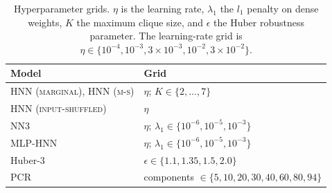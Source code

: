 \documentclass[sigconf,nonacm]{acmart}
\newcommand{\HNNMarg}{\textsc{HNN (marginal)}}
\newcommand{\HNNMS}{\textsc{HNN (m-s)}}
\newcommand{\HNNShuffle}{\textsc{HNN (input-shuffled)}}
\newcommand{\MLPHNN}{\textsc{MLP-HNN}}
\newcommand{\NNThree}{\textsc{NN3}}
\begin{document}
\begin{table}[h]
\centering
\caption{Hyperparameter grids. \(\eta\) is the learning rate,
\(\lambda_1\) the \(l_1\) penalty on dense weights, \(K\) the maximum clique
size, and \(\epsilon\) the Huber robustness parameter. The learning-rate grid is
\(\eta\in\{10^{-4},10^{-3},3\times10^{-3},10^{-2},3\times10^{-2}\}\).}
\label{tab:grids}
\small
\begin{tabular}{ll}
\toprule
Model & Grid\\
\midrule
\HNNMarg{}, \HNNMS{} & \(\eta\); \(K\in\{2,\ldots,7\}\)\\
\HNNShuffle{}        & \(\eta\)\\
\NNThree{}           & \(\eta\); \(\lambda_1\in\{10^{-6},10^{-5},10^{-3}\}\)\\
\MLPHNN{}            & \(\eta\); \(\lambda_1\in\{10^{-6},10^{-5},10^{-3}\}\)\\
Huber-3              & \(\epsilon\in\{1.1,1.35,1.5,2.0\}\)\\
PCR                  & components \(\in\{5,10,20,30,40,60,80,94\}\)\\
\bottomrule
\end{tabular}
\end{table}
\end{document}
